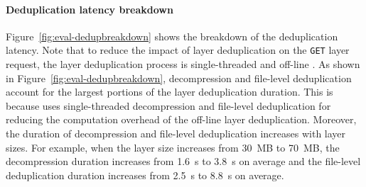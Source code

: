 \paragraph{Deduplication latency breakdown}
Figure~\ref{fig:eval-dedupbreakdown} shows the breakdown of the deduplication latency.
Note that to reduce the impact of layer deduplication on the \texttt{GET} layer request, the layer deduplication process is single-threaded and off-line .
As shown in Figure~\ref{fig:eval-dedupbreakdown}, decompression and file-level deduplication account for the largest portions of the layer deduplication duration.
This is because \sysname uses single-threaded decompression and file-level deduplication for reducing the computation overhead of the off-line layer deduplication.
Moreover, the duration of decompression and file-level deduplication increases with layer sizes.
For example, when the layer size increases from 30~MB to 70~MB, 
the decompression duration increases from 1.6~s to 3.8~s on average and the file-level deduplication duration increases from 2.5~s to 8.8~s on average.


